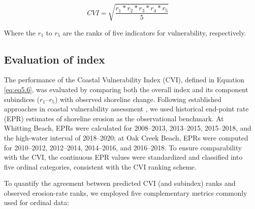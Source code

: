 \begin{equation}
    CVI = \sqrt{\frac{r_1*r_2*r_3*r_4*r_5}{5}}
\label{eq:eq5.6}
\end{equation}

Where the $r_1$ to $r_5$ are the ranks of five indicators for vulnerability,
respectively.

\subsection{Evaluation of index}
\label{Evaluation of index}
The performance of the Coastal Vulnerability Index (CVI), defined in Equation
\ref{eq:eq5.6}, was evaluated by comparing both the overall index and its
component subindices ($r_{1}$–$r_{5}$) with observed shoreline change. Following
established approaches in coastal vulnerability assessment
\citep[\eg][]{fuller2002bank,thieler2000national}, we used historical end-point
rate (EPR) estimates of shoreline erosion as the observational benchmark. At
Whitting Beach, EPRs were calculated for 2008–2013, 2013–2015, 2015–2018, and
the high-water interval of 2018–2020; at Oak Creek Beach, EPRs were computed for
2010–2012, 2012–2014, 2014–2016, and 2016–2018. To ensure comparability with the
CVI, the continuous EPR values were standardized and classified into five
ordinal categories, consistent with the CVI ranking scheme.  

To quantify the agreement between predicted CVI (and subindex) ranks and
observed erosion-rate ranks, we employed five complementary metrics commonly
used for ordinal data:

